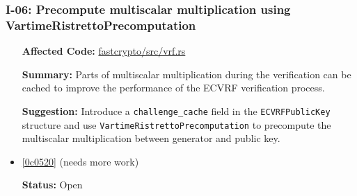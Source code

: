 \subsubsection*{I-06: Precompute multiscalar multiplication using VartimeRistrettoPrecomputation}
\begin{itemize}[align=left]
\item[\textbf{Affected Code:}] \href{https://github.com/MystenLabs/fastcrypto/blob/963205c6d0538fe548b8b10037cf87a53af6f424/fastcrypto/src/vrf.rs}{fastcrypto/src/vrf.rs}
\item[\textbf{Summary:}] Parts of multiscalar multiplication during the verification can be cached to improve the performance of the ECVRF verification process.
\item[\textbf{Suggestion:}] Introduce a \lstinline{challenge_cache} field in the \lstinline{ECVRFPublicKey} structure and use \lstinline{VartimeRistrettoPrecomputation} to precompute the multiscalar multiplication between generator and public key. 
\item[\textbf{Suggested Fix:}] \href{https://github.com/MystenLabs/fastcrypto/pull/543/commits/0c05200998a89fc177a26a8b9d4254bd0e0070de}{[0c0520]} (needs more work)
\item[\textbf{Status:}] Open
\end{itemize}
